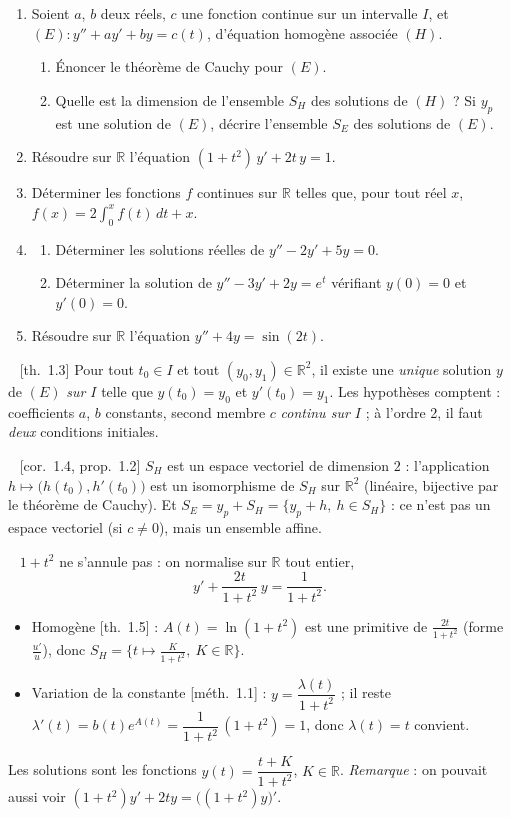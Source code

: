 \documentclass[a4paper,11pt]{article}
\newif\ifprof
\newcommand{\R}{\mathbb{R}}\newcommand{\C}{\mathbb{C}}\newcommand{\K}{\mathbb{K}}
\newcommand{\corrige}{\clearpage\noindent{\sffamily\bfseries\Large\color{Ocre}Corrigé}\par\nobreak
  \noindent{\color{Ocre}\rule{\linewidth}{0.8pt}}\par}
\newcommand{\q}[1]{\par\needspace{3\baselineskip}\smallskip{\sffamily\bfseries\color{Bleu}#1}\ }
\newcommand{\prop}[1]{{\sffamily\footnotesize\color{Gris}[#1]}}
\begin{document}
\begin{enumerate}
\item Soient $a$, $b$ deux réels, $c$ une fonction continue sur un intervalle $I$, et $(E)\colon y''+ay'+by=c(t)$,
      d'équation homogène associée $(H)$.
  \begin{enumerate}
  \item Énoncer le théorème de Cauchy pour $(E)$.
  \item Quelle est la dimension de l'ensemble $S_H$ des solutions de $(H)$ ? Si $y_p$ est une solution de $(E)$, décrire
        l'ensemble $S_E$ des solutions de $(E)$.
  \end{enumerate}
\item Résoudre sur $\R$ l'équation $(1+t^2)\,y'+2t\,y=1$.
\item Déterminer les fonctions $f$ continues sur $\R$ telles que, pour tout réel $x$, $f(x)=2\displaystyle\int_0^xf(t)\,dt+x$.
\item
  \begin{enumerate}
  \item Déterminer les solutions réelles de $y''-2y'+5y=0$.
  \item Déterminer la solution de $y''-3y'+2y=e^{t}$ vérifiant $y(0)=0$ et $y'(0)=0$.
  \end{enumerate}
\item Résoudre sur $\R$ l'équation $y''+4y=\sin(2t)$.
\end{enumerate}

\ifprof
\corrige
\q{1.a)} \prop{th.~1.3} Pour tout $t_0\in I$ et tout $(y_0,y_1)\in\R^2$, il existe une \emph{unique} solution $y$ de $(E)$
\emph{sur $I$} telle que $y(t_0)=y_0$ et $y'(t_0)=y_1$. Les hypothèses comptent : coefficients $a$, $b$ constants, second
membre $c$ \emph{continu sur $I$} ; à l'ordre 2, il faut \emph{deux} conditions initiales.

\q{1.b)} \prop{cor.~1.4, prop.~1.2} $S_H$ est un espace vectoriel de dimension $2$ : l'application $h\mapsto\big(h(t_0),h'(t_0)\big)$
est un isomorphisme de $S_H$ sur $\R^2$ (linéaire, bijective par le théorème de Cauchy). Et $S_E=y_p+S_H=\{y_p+h,\ h\in S_H\}$ :
ce n'est pas un espace vectoriel (si $c\neq0$), mais un ensemble affine.

\q{2.} $1+t^2$ ne s'annule pas : on normalise sur $\R$ tout entier,
\[y'+\frac{2t}{1+t^2}\,y=\frac1{1+t^2}.\]
\begin{itemize}
\item Homogène \prop{th.~1.5} : $A(t)=\ln(1+t^2)$ est une primitive de $\frac{2t}{1+t^2}$ (forme $\frac{u'}u$), donc
      $S_H=\big\{t\mapsto\frac K{1+t^2},\ K\in\R\big\}$.
\item Variation de la constante \prop{méth.~1.1} : $y=\dfrac{\lambda(t)}{1+t^2}$ ; il reste
      $\lambda'(t)=b(t)e^{A(t)}=\dfrac1{1+t^2}\,(1+t^2)=1$, donc $\lambda(t)=t$ convient.
\end{itemize}
Les solutions sont les fonctions $y(t)=\dfrac{t+K}{1+t^2}$, $K\in\R$.
\emph{Remarque} : on pouvait aussi voir $(1+t^2)y'+2ty=\big((1+t^2)y\big)'$.
\end{document}

